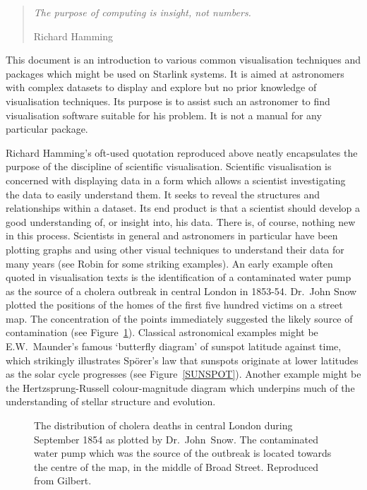 \begin{quote} \raggedright
\begin{center}
{\it The purpose of computing is insight, not numbers.} \\
\end{center}
Richard Hamming \raggedleft
\end{quote}

This document is an introduction to various common visualisation 
techniques and packages which might be used on Starlink systems. It is
aimed at astronomers with complex datasets to display and explore but
no prior knowledge of visualisation techniques. Its purpose is to
assist such an astronomer to find visualisation software suitable for his
problem. It is not a manual for any particular package.

Richard Hamming's oft-used quotation reproduced above\cite{HAMMING}
neatly encapsulates the purpose of the discipline of scientific
visualisation. Scientific visualisation is concerned with displaying data
in a form which allows a scientist investigating the data to easily
understand them. It seeks to reveal the structures and relationships within
a dataset. Its end product is that a scientist should develop a good
understanding of, or insight into, his data. There is, of course, nothing
new in this process. Scientists in general and astronomers in particular
have been plotting graphs and using other visual techniques to
understand their data for many years (see Robin\cite{ROBIN} for some
striking examples). An early example often quoted in visualisation texts
is the identification of a contaminated water pump as the source of a
cholera outbreak in central London in 1853-54. Dr.~John Snow plotted the
positions of the homes of the first five hundred victims on a street map.
The concentration of the points immediately suggested the likely source of
contamination (see Figure~\ref{CHOLERA}). Classical astronomical examples
might be E.W.~Maunder's famous `butterfly diagram' of sunspot latitude
against time, which strikingly illustrates Sp\"{o}rer's law that sunspots
originate at lower latitudes as the solar cycle progresses (see 
Figure~\ref{SUNSPOT}). Another example might be the Hertzsprung-Russell
colour-magnitude diagram which underpins much of the understanding of
stellar structure and evolution.

\begin{figure}[htbp]
\begin{center}
\leavevmode
\epsfxsize=461pt
\end{center}

\caption[Cholera deaths in central London.]{The distribution of cholera
deaths in central London during September 1854 as plotted by
Dr.~John~Snow. The contaminated water pump which was the source of the
outbreak is located towards the centre of the map, in the middle of
Broad Street. Reproduced from Gilbert\cite{GILBERT}. \label{CHOLERA} }

\end{figure}

